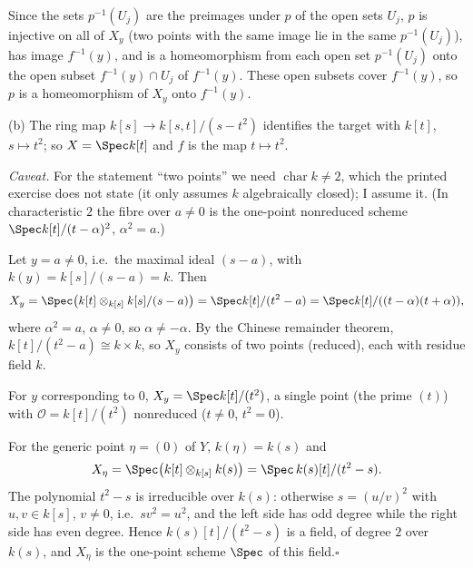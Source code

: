 \documentclass[11pt]{article}
\begin{document}
Since the sets $p^{-1}(U_j)$ are the preimages under $p$ of the open sets $U_j$, $p$ is injective on all of $X_y$ (two points with the same image lie in the same $p^{-1}(U_j)$), has image $f^{-1}(y)$, and is a homeomorphism from each open set $p^{-1}(U_j)$ onto the open subset $f^{-1}(y)\cap U_j$ of $f^{-1}(y)$. These open subsets cover $f^{-1}(y)$, so $p$ is a homeomorphism of $X_y$ onto $f^{-1}(y)$.

(b) The ring map $k[s]\to k[s,t]/(s-t^2)$ identifies the target with $k[t]$, $s\mapsto t^2$; so $X=\Spec k[t]$ and $f$ is the map $t\mapsto t^2$.

\emph{Caveat.} For the statement ``two points'' we need $\operatorname{char}k\ne2$, which the printed exercise does not state (it only assumes $k$ algebraically closed); I assume it. (In characteristic $2$ the fibre over $a\ne0$ is the one-point nonreduced scheme $\Spec k[t]/(t-\alpha)^2$, $\alpha^2=a$.)

Let $y=a\ne0$, i.e.\ the maximal ideal $(s-a)$, with $k(y)=k[s]/(s-a)=k$. Then
\[X_y=\Spec\big(k[t]\otimes_{k[s]}k[s]/(s-a)\big)=\Spec k[t]/(t^2-a)=\Spec k[t]/((t-\alpha)(t+\alpha)),\]
where $\alpha^2=a$, $\alpha\ne0$, so $\alpha\ne-\alpha$. By the Chinese remainder theorem, $k[t]/(t^2-a)\cong k\times k$, so $X_y$ consists of two points (reduced), each with residue field $k$.

For $y$ corresponding to $0$, $X_y=\Spec k[t]/(t^2)$, a single point (the prime $(t)$) with $\mathcal O=k[t]/(t^2)$ nonreduced ($t\neq0$, $t^2=0$).

For the generic point $\eta=(0)$ of $Y$, $k(\eta)=k(s)$ and
\[X_\eta=\Spec\big(k[t]\otimes_{k[s]}k(s)\big)=\Spec\, k(s)[t]/(t^2-s).\]
The polynomial $t^2-s$ is irreducible over $k(s)$: otherwise $s=(u/v)^2$ with $u,v\in k[s]$, $v\ne0$, i.e.\ $sv^2=u^2$, and the left side has odd degree while the right side has even degree. Hence $k(s)[t]/(t^2-s)$ is a field, of degree $2$ over $k(s)$, and $X_\eta$ is the one-point scheme $\Spec$ of this field.\hfill$\square$
\end{document}
